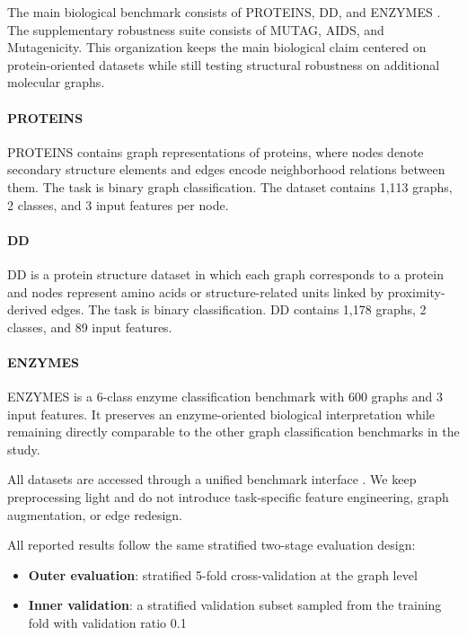 The main biological benchmark consists of PROTEINS, DD, and ENZYMES \cite{fey2019fast,morris2020tudataset}. The supplementary robustness suite consists of MUTAG, AIDS, and Mutagenicity. This organization keeps the main biological claim centered on protein-oriented datasets while still testing structural robustness on additional molecular graphs.

\paragraph{PROTEINS}
PROTEINS contains graph representations of proteins, where nodes denote secondary structure elements and edges encode neighborhood relations between them. The task is binary graph classification. The dataset contains 1,113 graphs, 2 classes, and 3 input features per node.

\paragraph{DD}
DD is a protein structure dataset in which each graph corresponds to a protein and nodes represent amino acids or structure-related units linked by proximity-derived edges. The task is binary classification. DD contains 1,178 graphs, 2 classes, and 89 input features.

\paragraph{ENZYMES}
ENZYMES is a 6-class enzyme classification benchmark with 600 graphs and 3 input features. It preserves an enzyme-oriented biological interpretation while remaining directly comparable to the other graph classification benchmarks in the study.



All datasets are accessed through a unified benchmark interface \cite{fey2019fast,morris2020tudataset}. We keep preprocessing light and do not introduce task-specific feature engineering, graph augmentation, or edge redesign.

All reported results follow the same stratified two-stage evaluation design:
\begin{itemize}
    \item \textbf{Outer evaluation}: stratified 5-fold cross-validation at the graph level
    \item \textbf{Inner validation}: a stratified validation subset sampled from the training fold with validation ratio 0.1
\end{itemize}

